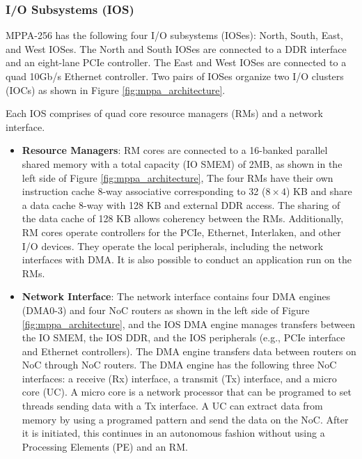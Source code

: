 \documentclass{sig-alternate-05-2015}
\begin{document}
\subsubsection{I/O Subsystems (IOS)}
\label{sec:ios}
MPPA-256 has the following four I/O subsystems (IOSes): North, South, East, and West IOSes.
The North and South IOSes are connected to a DDR interface and an eight-lane PCIe controller.
The East and West IOSes are connected to a quad 10Gb/s Ethernet controller.
Two pairs of IOSes organize two I/O clusters (IOCs) as shown in Figure \ref{fig:mppa_architecture}.

Each IOS comprises of quad core resource managers (RMs) and a network interface.
\begin{itemize}
\item \textbf{Resource Managers}: RM cores are connected to a 16-banked parallel shared memory with a total capacity (IO SMEM) of 2MB, as shown in the left side of Figure \ref{fig:mppa_architecture},
The four RMs have their own instruction cache 8-way associative corresponding to 32 ($8 \times 4$) KB and share a data cache 8-way with 128 KB and external DDR access.
The sharing of the data cache of 128 KB allows coherency between the RMs.
Additionally, RM cores operate controllers for the PCIe, Ethernet, Interlaken, and other I/O devices.
They operate the local peripherals, including the network interfaces with DMA.
It is also possible to conduct an application run on the RMs.
\item \textbf{Network Interface}: The network interface contains four DMA engines (DMA0-3) and four NoC routers as shown in the left side of Figure \ref{fig:mppa_architecture}, and the IOS DMA engine manages transfers between the IO SMEM, the IOS DDR, and the IOS peripherals (e.g., PCIe interface and Ethernet controllers).
The DMA engine transfers data between routers on NoC through NoC routers.
The DMA engine has the following three NoC interfaces: a receive (Rx) interface, a transmit (Tx) interface, and a micro core (UC).
A micro core is a network processor that can be programed to set threads sending data with a Tx interface.
A UC can extract data from memory by using a programed pattern and send the data on the NoC.
After it is initiated, this continues in an autonomous fashion without using a Processing Elements (PE) and an RM.
\end{itemize}
\end{document}
